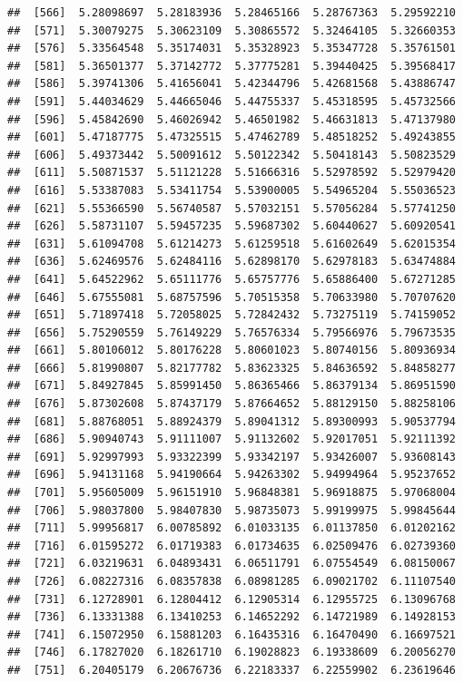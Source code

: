 \documentclass[
  11pt]{report}
\begin{document}
\begin{itemize}
\begin{verbatim}
##  [566]  5.28098697  5.28183936  5.28465166  5.28767363  5.29592210
##  [571]  5.30079275  5.30623109  5.30865572  5.32464105  5.32660353
##  [576]  5.33564548  5.35174031  5.35328923  5.35347728  5.35761501
##  [581]  5.36501377  5.37142772  5.37775281  5.39440425  5.39568417
##  [586]  5.39741306  5.41656041  5.42344796  5.42681568  5.43886747
##  [591]  5.44034629  5.44665046  5.44755337  5.45318595  5.45732566
##  [596]  5.45842690  5.46026942  5.46501982  5.46631813  5.47137980
##  [601]  5.47187775  5.47325515  5.47462789  5.48518252  5.49243855
##  [606]  5.49373442  5.50091612  5.50122342  5.50418143  5.50823529
##  [611]  5.50871537  5.51121228  5.51666316  5.52978592  5.52979420
##  [616]  5.53387083  5.53411754  5.53900005  5.54965204  5.55036523
##  [621]  5.55366590  5.56740587  5.57032151  5.57056284  5.57741250
##  [626]  5.58731107  5.59457235  5.59687302  5.60440627  5.60920541
##  [631]  5.61094708  5.61214273  5.61259518  5.61602649  5.62015354
##  [636]  5.62469576  5.62484116  5.62898170  5.62978183  5.63474884
##  [641]  5.64522962  5.65111776  5.65757776  5.65886400  5.67271285
##  [646]  5.67555081  5.68757596  5.70515358  5.70633980  5.70707620
##  [651]  5.71897418  5.72058025  5.72842432  5.73275119  5.74159052
##  [656]  5.75290559  5.76149229  5.76576334  5.79566976  5.79673535
##  [661]  5.80106012  5.80176228  5.80601023  5.80740156  5.80936934
##  [666]  5.81990807  5.82177782  5.83623325  5.84636592  5.84858277
##  [671]  5.84927845  5.85991450  5.86365466  5.86379134  5.86951590
##  [676]  5.87302608  5.87437179  5.87664652  5.88129150  5.88258106
##  [681]  5.88768051  5.88924379  5.89041312  5.89300993  5.90537794
##  [686]  5.90940743  5.91111007  5.91132602  5.92017051  5.92111392
##  [691]  5.92997993  5.93322399  5.93342197  5.93426007  5.93608143
##  [696]  5.94131168  5.94190664  5.94263302  5.94994964  5.95237652
##  [701]  5.95605009  5.96151910  5.96848381  5.96918875  5.97068004
##  [706]  5.98037800  5.98407830  5.98735073  5.99199975  5.99845644
##  [711]  5.99956817  6.00785892  6.01033135  6.01137850  6.01202162
##  [716]  6.01595272  6.01719383  6.01734635  6.02509476  6.02739360
##  [721]  6.03219631  6.04893431  6.06511791  6.07554549  6.08150067
##  [726]  6.08227316  6.08357838  6.08981285  6.09021702  6.11107540
##  [731]  6.12728901  6.12804412  6.12905314  6.12955725  6.13096768
##  [736]  6.13331388  6.13410253  6.14652292  6.14721989  6.14928153
##  [741]  6.15072950  6.15881203  6.16435316  6.16470490  6.16697521
##  [746]  6.17827020  6.18261710  6.19028823  6.19338609  6.20056270
##  [751]  6.20405179  6.20676736  6.22183337  6.22559902  6.23619646

\end{verbatim}
\end{itemize}
\end{document}
